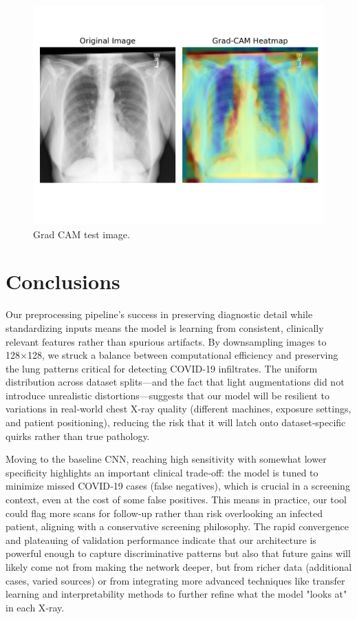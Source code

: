 \documentclass[conference]{IEEEtran}
\begin{document}
\begin{figure}[htbp]
	\centerline{\includegraphics[width=\linewidth]{Images/gradcam.png}}
	\caption{Grad CAM test image.}
	\label{fig:gradcam}
\end{figure}

\section{Conclusions}\label{sec:conclusions}

Our preprocessing pipeline’s success in preserving diagnostic detail while standardizing inputs means the model is learning from consistent, clinically relevant features rather than spurious artifacts. By downsampling images to 128×128, we struck a balance between computational efficiency and preserving the lung patterns critical for detecting COVID‑19 infiltrates. The uniform distribution across dataset splits—and the fact that light augmentations did not introduce unrealistic distortions—suggests that our model will be resilient to variations in real‑world chest X‑ray quality (different machines, exposure settings, and patient positioning), reducing the risk that it will latch onto dataset‐specific quirks rather than true pathology.

Moving to the baseline CNN, reaching high sensitivity with somewhat lower specificity highlights an important clinical trade‑off: the model is tuned to minimize missed COVID‑19 cases (false negatives), which is crucial in a screening context, even at the cost of some false positives. This means in practice, our tool could flag more scans for follow‑up rather than risk overlooking an infected patient, aligning with a conservative screening philosophy. The rapid convergence and plateauing of validation performance indicate that our architecture is powerful enough to capture discriminative patterns but also that future gains will likely come not from making the network deeper, but from richer data (additional cases, varied sources) or from integrating more advanced techniques like transfer learning and interpretability methods to further refine what the model "looks at" in each X‑ray.
\end{document}
